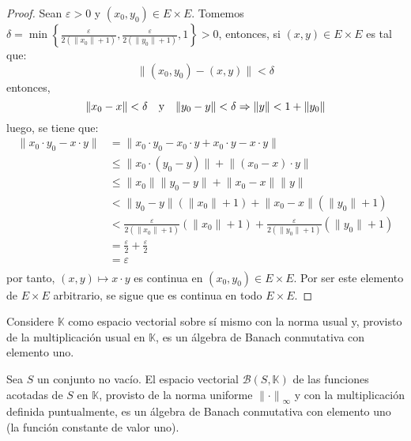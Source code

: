 \documentclass[12pt]{report}
\theoremstyle{largebreak}
\newcommand\norm[1]{\ensuremath{\|#1\|}}
\begin{document}
    \begin{proof}
        Sean $\varepsilon>0$ y $(x_0,y_0)\in E\times E$. Tomemos $\delta=\min\left\{\frac{\varepsilon}{2(\norm{x_0}+1)},\frac{\varepsilon}{2(\norm{y_0}+1)},1\right\}>0$, entonces, si $(x,y)\in E\times E$ es tal que:
        \begin{equation*}
            \norm{(x_0,y_0)-(x,y)}<\delta
        \end{equation*}
        entonces,
        \begin{equation*}
            \norm{x_0-x}<\delta\quad\textup{y}\quad\norm{y_0-y}<\delta\Rightarrow\norm{y}<1+\norm{y_0}
        \end{equation*}
        luego, se tiene que:
        \begin{equation*}
            \begin{split}
                \norm{x_0\cdot y_0-x\cdot y}&=\norm{x_0\cdot y_0-x_0\cdot y+ x_0\cdot y-x\cdot y}\\
                &\leq\norm{x_0\cdot(y_0-y)}+\norm{(x_0-x)\cdot y}\\
                &\leq\norm{x_0}\norm{y_0-y}+\norm{x_0-x}\norm{y}\\
                &<\norm{y_0-y}(\norm{x_0}+1)+\norm{x_0-x}(\norm{y_0}+1)\\
                &<\frac{\varepsilon}{2(\norm{x_0}+1)}(\norm{x_0}+1)+\frac{\varepsilon}{2(\norm{y_0}+1)}(\norm{y_0}+1)\\
                &=\frac{\varepsilon}{2}+\frac{\varepsilon}{2}\\
                &=\varepsilon\\
            \end{split}
        \end{equation*}
        por tanto, $(x,y)\mapsto x\cdot y$ es continua en $(x_0,y_0)\in E\times E$. Por ser este elemento de $E\times E$ arbitrario, se sigue que es continua en todo $E\times E$.

    \end{proof}

    \begin{exa}
        Considere $\mathbb{K}$ como espacio vectorial sobre sí mismo con la norma usual y, provisto de la multiplicación usual en $\mathbb{K}$, es un álgebra de Banach conmutativa con elemento uno.
    \end{exa}
    
    \begin{exa}
        Sea $S$ un conjunto no vacío. El espacio vectorial $\mathcal{B}(S,\mathbb{K})$ de las funciones acotadas de $S$ en $\mathbb{K}$, provisto de la norma uniforme $\norm{\cdot}_\infty$ y con la multiplicación definida puntualmente, es un álgebra de Banach conmutativa con elemento uno (la función constante de valor uno).
    \end{exa}
\end{document}
